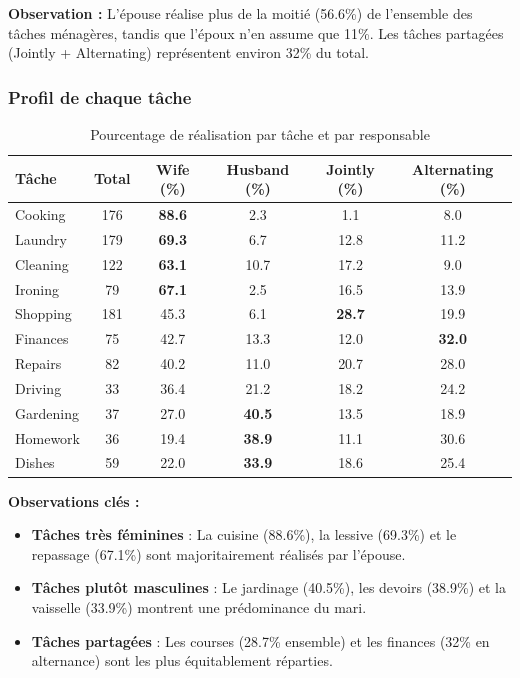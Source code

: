 \documentclass[12pt,a4paper]{article}
\begin{document}
\textbf{Observation :} L'épouse réalise plus de la moitié (56.6\%) de l'ensemble des tâches ménagères, tandis que l'époux n'en assume que 11\%. Les tâches partagées (Jointly + Alternating) représentent environ 32\% du total.

\subsubsection{Profil de chaque tâche}

\begin{table}[H]
\centering
\caption{Pourcentage de réalisation par tâche et par responsable}
\footnotesize
\begin{tabular}{|l|c|c|c|c|c|}
\hline
\textbf{Tâche} & \textbf{Total} & \textbf{Wife (\%)} & \textbf{Husband (\%)} & \textbf{Jointly (\%)} & \textbf{Alternating (\%)} \\
\hline
Cooking & 176 & \textbf{88.6} & 2.3 & 1.1 & 8.0 \\
Laundry & 179 & \textbf{69.3} & 6.7 & 12.8 & 11.2 \\
Cleaning & 122 & \textbf{63.1} & 10.7 & 17.2 & 9.0 \\
Ironing & 79 & \textbf{67.1} & 2.5 & 16.5 & 13.9 \\
Shopping & 181 & 45.3 & 6.1 & \textbf{28.7} & 19.9 \\
Finances & 75 & 42.7 & 13.3 & 12.0 & \textbf{32.0} \\
Repairs & 82 & 40.2 & 11.0 & 20.7 & 28.0 \\
Driving & 33 & 36.4 & 21.2 & 18.2 & 24.2 \\
Gardening & 37 & 27.0 & \textbf{40.5} & 13.5 & 18.9 \\
Homework & 36 & 19.4 & \textbf{38.9} & 11.1 & 30.6 \\
Dishes & 59 & 22.0 & \textbf{33.9} & 18.6 & 25.4 \\
\hline
\end{tabular}
\end{table}

\textbf{Observations clés :}
\begin{itemize}
    \item \textbf{Tâches très féminines} : La cuisine (88.6\%), la lessive (69.3\%) et le repassage (67.1\%) sont majoritairement réalisés par l'épouse.
    \item \textbf{Tâches plutôt masculines} : Le jardinage (40.5\%), les devoirs (38.9\%) et la vaisselle (33.9\%) montrent une prédominance du mari.
    \item \textbf{Tâches partagées} : Les courses (28.7\% ensemble) et les finances (32\% en alternance) sont les plus équitablement réparties.
\end{itemize}
\end{document}
